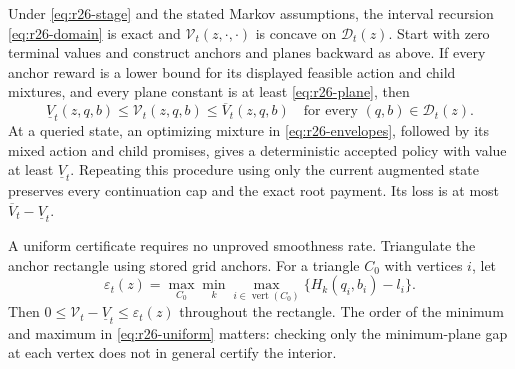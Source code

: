 \begin{theorem}\label{thm:r26-envelopes}
Under \eqref{eq:r26-stage} and the stated Markov assumptions, the interval recursion \eqref{eq:r26-domain} is exact and $\mathcal V_t(z,\cdot,\cdot)$ is concave on $\mathcal D_t(z)$. Start with zero terminal values and construct anchors and planes backward as above. If every anchor reward is a lower bound for its displayed feasible action and child mixtures, and every plane constant is at least \eqref{eq:r26-plane}, then
\begin{equation}\label{eq:r26-bracket}
 \underline V_t(z,q,b)\leq\mathcal V_t(z,q,b)\leq\overline V_t(z,q,b)
 \quad\text{for every }(q,b)\in\mathcal D_t(z).
\end{equation}
At a queried state, an optimizing mixture in \eqref{eq:r26-envelopes}, followed by its mixed action and child promises, gives a deterministic accepted policy with value at least $\underline V_t$. Repeating this procedure using only the current augmented state preserves every continuation cap and the exact root payment. Its loss is at most $\overline V_t-\underline V_t$.

A uniform certificate requires no unproved smoothness rate. Triangulate the anchor rectangle using stored grid anchors. For a triangle $C_0$ with vertices $i$, let
\begin{equation}\label{eq:r26-uniform}
 \varepsilon_t(z)=\max_{C_0}\min_k\max_{i\in\operatorname{vert}(C_0)}
 \{H_k(q_i,b_i)-l_i\}.
\end{equation}
Then $0\leq\mathcal V_t-\underline V_t\leq\varepsilon_t(z)$ throughout the rectangle. The order of the minimum and maximum in \eqref{eq:r26-uniform} matters: checking only the minimum-plane gap at each vertex does not in general certify the interior.
\end{theorem}
